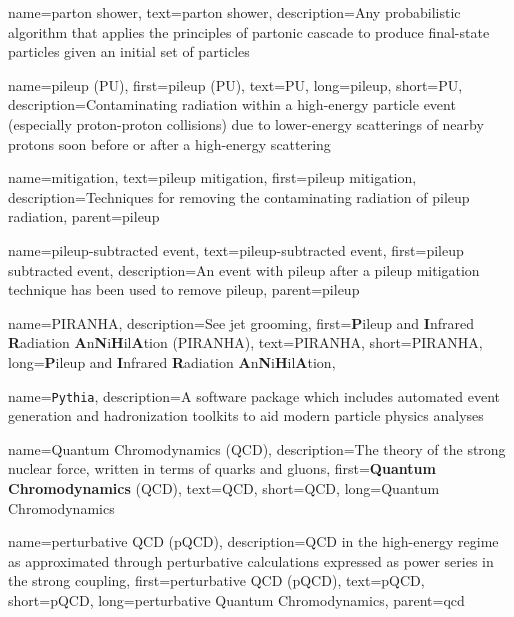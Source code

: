 {
  name=parton shower,
  text=parton shower,
  description={Any probabilistic algorithm that applies the principles of partonic cascade to produce final-state particles given an initial set of particles}
}


{
  name=pileup (PU),
  first=pileup (PU),
  text=PU,
  long=pileup,
  short=PU,
  description={Contaminating radiation within a high-energy particle event (especially proton-proton collisions) due to lower-energy scatterings of nearby protons soon before or after a high-energy scattering}
}

    {
      name=mitigation,
      text=pileup mitigation,
      first=pileup mitigation,
      description={Techniques for removing the contaminating radiation of pileup radiation},
      parent=pileup
    }

    {
      name=pileup-subtracted event,
      text=pileup-subtracted event,
      first=pileup subtracted event,
      description={An event with pileup after a pileup mitigation technique has been used to remove pileup},
      parent=pileup
    }

{
    name=PIRANHA,
    description={See jet grooming},
    first={\textbf{P}ileup and \textbf{I}nfrared \textbf{R}adiation \textbf{A}n\textbf{N}i\textbf{H}il\textbf{A}tion (PIRANHA)},
    text={PIRANHA},
    short={PIRANHA},
    long={\textbf{P}ileup and \textbf{I}nfrared \textbf{R}adiation \textbf{A}n\textbf{N}i\textbf{H}il\textbf{A}tion},
}


{
  name=\texttt{Pythia},
  description={A software package which includes automated event generation and hadronization toolkits to aid modern particle physics analyses}
}

{
    name=Quantum Chromodynamics (QCD),
    description={The theory of the strong nuclear force, written in terms of quarks and gluons},
    first={\textbf{Quantum Chromodynamics} (QCD)},
    text={QCD},
    short={QCD},
    long={Quantum Chromodynamics}
}

    {
        name=perturbative QCD (pQCD),
        description={QCD in the high-energy regime as approximated through perturbative calculations expressed as power series in the strong coupling},
        first={perturbative QCD (pQCD)},
        text={pQCD},
        short={pQCD},
        long={perturbative Quantum Chromodynamics},
        parent=qcd
    }



